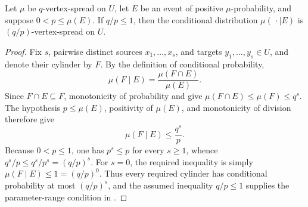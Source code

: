 \begin{lemma}
Let $\mu$ be $q$-vertex-spread on $U$, let $E$ be an event of positive $\mu$-probability, and suppose $0<p\leq\mu(E)$.  If $q/p\leq1$, then the conditional distribution $\mu(\,\cdot\mid E)$ is $(q/p)$-vertex-spread on $U$.
\end{lemma}
\begin{proof}
Fix $s$, pairwise distinct sources $x_1,\ldots,x_s$, and targets $y_1,\ldots,y_s\in U$, and denote their cylinder by $F$.  By the definition of conditional probability,
\[
 \mu(F\mid E)=\frac{\mu(F\cap E)}{\mu(E)}.
\]
Since $F\cap E\subseteq F$, monotonicity of probability and  give $\mu(F\cap E)\leq\mu(F)\leq q^s$.  The hypothesis $p\leq\mu(E)$, positivity of $\mu(E)$, and monotonicity of division therefore give
\[
 \mu(F\mid E)\leq\frac{q^s}{p}.
\]
Because $0<p\leq1$, one has $p^s\leq p$ for every $s\geq1$, whence $q^s/p\leq q^s/p^s=(q/p)^s$.  For $s=0$, the required inequality is simply $\mu(F\mid E)\leq1=(q/p)^0$.  Thus every required cylinder has conditional probability at most $(q/p)^s$, and the assumed inequality $q/p\leq1$ supplies the parameter-range condition in .
\end{proof}
